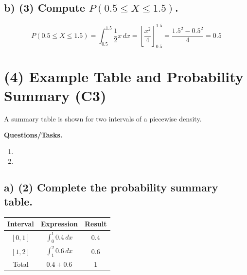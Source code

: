 

\subsection*{b) \textbf{(3)} Compute $P(0.5\le X\le 1.5)$.}
\label{subsec:example-linear-density-model-c2-b}
\[
P(0.5\le X\le 1.5)=\int_{0.5}^{1.5}\frac12x\,dx
=\left[\frac{x^2}{4}\right]_{0.5}^{1.5}=\frac{1.5^2-0.5^2}{4}=0.5
\]


\section{(4) Example Table and Probability Summary (C3)}
\label{sec:example-table-and-probability-summary-c3}
A summary table is shown for two intervals of a piecewise density.

\textbf{Questions/Tasks.}
\begin{enumerate}[label=\textbf{\alph*)}]
    \item {}
    \item {}
\end{enumerate}

\subsection*{a) \textbf{(2)} Complete the probability summary table.}
\label{subsec:example-table-and-probability-summary-c3-a}
\begin{center}
\begin{tabular}{|c|c|c|}
\hline
Interval & Expression & Result \\
\hline
$[0,1]$ & $\int_0^1 0.4\,dx$ & $0.4$ \\
$[1,2]$ & $\int_1^2 0.6\,dx$ & $0.6$ \\
\hline
Total & $0.4+0.6$ & $1$ \\
\hline
\end{tabular}
\end{center}


